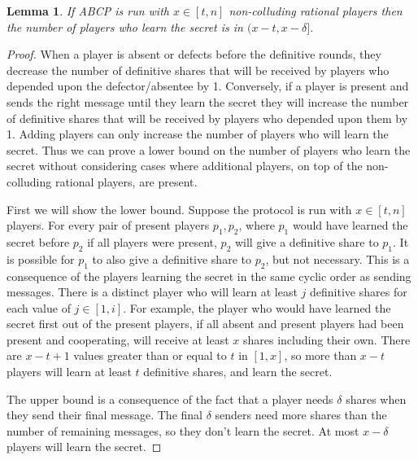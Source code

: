 \documentclass[12pt]{dalcsthesis}
\newtheorem{lemma}{Lemma}
\begin{document}
\begin{lemma}\label{Lem:ABCP:SomeDeltaLose}If ABCP is run with $x \in [t,n]$ non-colluding rational players then the number of players who learn the secret is in $(x-t, x-\delta]$.\end{lemma}
\begin{proof}
When a player is absent or defects before the definitive rounds, they decrease the number of definitive shares that will be received by players who depended upon the defector/absentee by 1. Conversely, if a player is present and sends the right message until they learn the secret they will increase the number of definitive shares that will be received by players who depended upon them by 1. Adding players can only increase the number of players who will learn the secret. Thus we can prove a lower bound on the number of players who learn the secret without considering cases where additional players, on top of the non-colluding rational players, are present.

First we will show the lower bound. Suppose the protocol is run with $x \in [t,n]$ players. For every pair of present players $p_1, p_2$, where $p_1$ would have learned the secret before $p_2$ if all players were present, $p_2$ will give a definitive share to $p_1$. It is possible for $p_1$ to also give a definitive share to $p_2$, but not necessary. This is a consequence of the players learning the secret in the same cyclic order as sending messages. There is a distinct player who will learn at least $j$ definitive shares for each value of $j \in [1, i]$. For example, the player who would have learned the secret first out of the present players, if all absent and present players had been present and cooperating, will receive at least $x$ shares including their own. There are $x-t+1$ values greater than or equal to $t$ in $[1,x]$, so more than $x-t$ players will learn at least $t$ definitive shares, and learn the secret.

The upper bound is a consequence of the fact that a player needs $\delta$ shares when they send their final message. The final $\delta$ senders need more shares than the number of remaining messages, so they don't learn the secret. At most $x-\delta$ players will learn the secret.  
\end{proof}
\end{document}
